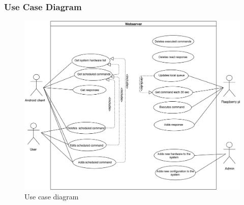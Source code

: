 \documentclass[12pt, oneside, a4paper]{book}
\begin{document}
				\subsubsection{Use Case Diagram}
					\begin{figure}[H]
					\includegraphics[width=\linewidth]{img/diagram_usecase.jpg}
					\caption{Use case diagram}
					\end{figure}
				
\end{document}
